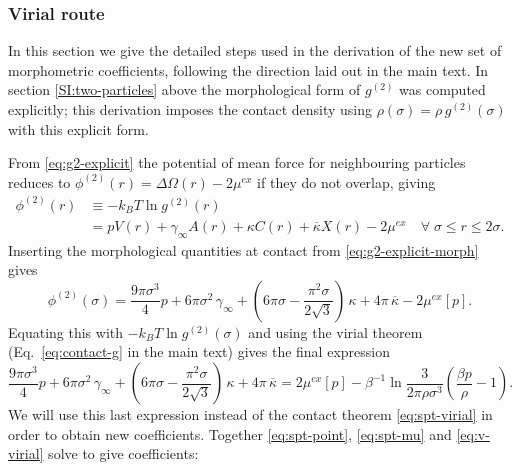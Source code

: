 \documentclass[12pt]{report}
\begin{document}
\subsubsection{Virial route}

In this section we give the detailed steps used in the derivation of the new set of morphometric coefficients, following the direction laid out in the main text.
In section \ref{SI:two-particles} above the morphological form of $g^{(2)}$ was computed explicitly; this derivation imposes the contact density using $\rho(\sigma) = \rho \, g^{(2)}(\sigma)$ with this explicit form.

From \eqref{eq:g2-explicit} the potential of mean force for neighbouring particles reduces to $\phi^{(2)}(r) = \Delta\Omega(r) - 2\mu^{ex}$ if they do not overlap, giving
\begin{equation}
  \begin{split}
  \phi^{(2)}(r) &\equiv - k_B T \ln g^{(2)}(r) \\
  &= pV(r) + \gamma_\infty A(r) + \kappa C(r) + \overline{\kappa} X(r) - 2\mu^{ex}
  \quad \forall \; \sigma \le r \le 2\sigma.
  \end{split}
\end{equation}
Inserting the morphological quantities at contact from \eqref{eq:g2-explicit-morph} gives
\begin{equation}
  \phi^{(2)}(\sigma) =
  \frac{9\pi \sigma^3}{4} p +
  6\pi\sigma^2 \, \gamma_\infty +
  \left( 6\pi\sigma - \frac{\pi^2\sigma}{2\sqrt{3}} \right) \, \kappa +
  4\pi \, \overline{\kappa}
  - 2\mu^{ex}[p].
\end{equation}
Equating this with $-k_B T \ln g^{(2)}(\sigma)$ and using the virial theorem (Eq.\ \eqref{eq:contact-g} in the main text) gives the final expression
\begin{equation}\label{eq:v-virial}
  \frac{9\pi \sigma^3}{4} p +
  6\pi\sigma^2 \, \gamma_\infty +
  \left( 6\pi\sigma - \frac{\pi^2\sigma}{2\sqrt{3}} \right) \, \kappa +
  4\pi \, \overline{\kappa} =
  2\mu^{ex}[p] - \beta^{-1} \ln{\frac{3}{2\pi \rho \sigma^3} \left( \frac{\beta p}{\rho} - 1 \right)}.
\end{equation}
We will use this last expression instead of the contact theorem \eqref{eq:spt-virial} in order to obtain new coefficients.
Together \eqref{eq:spt-point}, \eqref{eq:spt-mu} and \eqref{eq:v-virial} solve to give coefficients:
\end{document}
